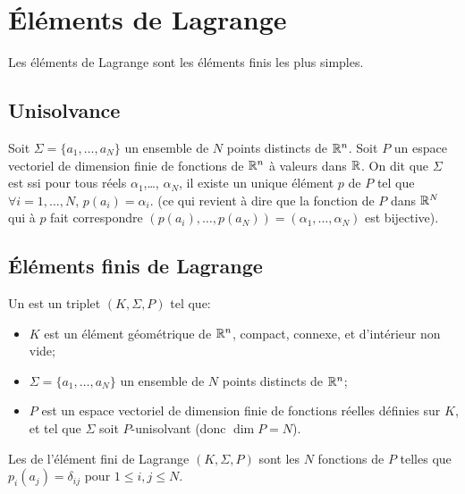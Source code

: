 \medskip
\section{Éléments de Lagrange}

Les éléments de Lagrange sont les éléments finis les plus simples.

\medskip
\subsection{Unisolvance}\label{Sec-unisolvance}

\begin{definition}[Unisolvance]
Soit $\Sigma=\{a_1,\ldots, a_N\}$ un ensemble de $N$ points distincts de $\mathbb R^n$.
Soit $P$ un espace vectoriel de dimension finie de fonctions de $\mathbb R^n$ à valeurs dans $\mathbb R$.
On dit que $\Sigma$ est  ssi pour tous réels $\alpha_1$,\ldots, $\alpha_N$,
il existe un unique élément $p$ de $P$ tel que $\forall i=1,\ldots, N$, $p(a_i) = \alpha_i$.
(ce qui revient à dire que la fonction de $P$ dans $\mathbb R^N$ qui à $p$ fait correspondre
$(p(a_i),\ldots, p(a_N))=(\alpha_1,\ldots, \alpha_N)$ est bijective).
\end{definition}

\medskip
\subsection{Éléments finis de Lagrange}

\begin{definition}
Un  est un triplet $(K, \Sigma, P)$ tel que:
\begin{itemize}
\item $K$ est un élément géométrique de $\mathbb R^n$, compact, connexe, et d'intérieur
	non vide;
\item $\Sigma=\{a_1,\ldots, a_N\}$ un ensemble de $N$ points distincts de $\mathbb R^n$;
\item $P$ est un espace vectoriel de dimension finie de fonctions réelles définies sur $K$, et tel
	que $\Sigma$ soit $P$-unisolvant (donc $\dim P = N$).
\end{itemize}
\end{definition}

\medskip
Les  de l'élément fini de Lagrange $(K, \Sigma, P)$
sont les $N$ fonctions de $P$ telles que $p_i(a_j)=\delta_{ij}$ pour $1\le i,j\le N$.

